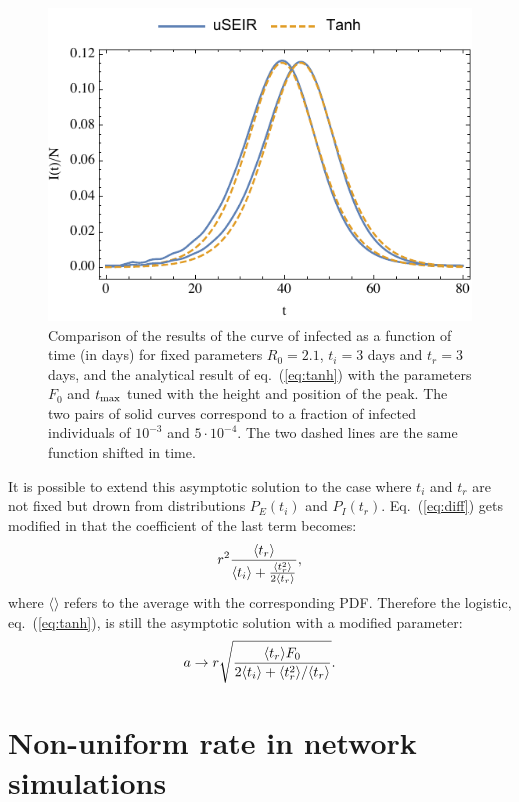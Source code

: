 \documentclass[10pt,letterpaper]{article}
\begin{document}
\begin{figure}[h!]
  \centering
  \includegraphics[width=12cm]{logistica.pdf}
  \caption{Comparison of the results of the curve of infected as a function of time (in days) for fixed parameters $R_0=2.1$, $t_i=3$ days and $t_r=3$ days, and the analytical result of  eq.~(\ref{eq:tanh}) with the parameters $F_0$ and $t_{\rm max}$ tuned with the height and position of the peak. The two pairs of solid curves correspond to a fraction of infected individuals of $10^{-3}$ and $5\cdot 10^{-4}$. The two dashed lines are the same function shifted in time.}
  \label{fig:logistic}
   \end{figure}

It is possible to extend this asymptotic solution to the case where 
$t_i$ and $t_r$ are not fixed but drown from distributions $P_E(t_i)$
and $P_I(t_r)$. Eq.~(\ref{eq:diff}) gets modified in that the coefficient of the last term becomes:
\begin{eqnarray}
r^2 {\langle t_r\rangle \over \langle t_i\rangle + {\langle t_r^2\rangle\over 2 \langle t_r\rangle}},
\end{eqnarray}
where $\langle \rangle$  refers to the average  with the corresponding PDF. Therefore the logistic, eq.~(\ref{eq:tanh}), is still the asymptotic solution with a modified parameter:
\begin{eqnarray}
a \rightarrow r \sqrt{ \langle t_r\rangle F_0\over 2 \langle t_i \rangle + \langle t_r^2\rangle/\langle t_r\rangle}. 
\label{eq:aint}
\end{eqnarray}
 
\section*{Non-uniform rate in network simulations  }
\label{sec:net}
\end{document}
